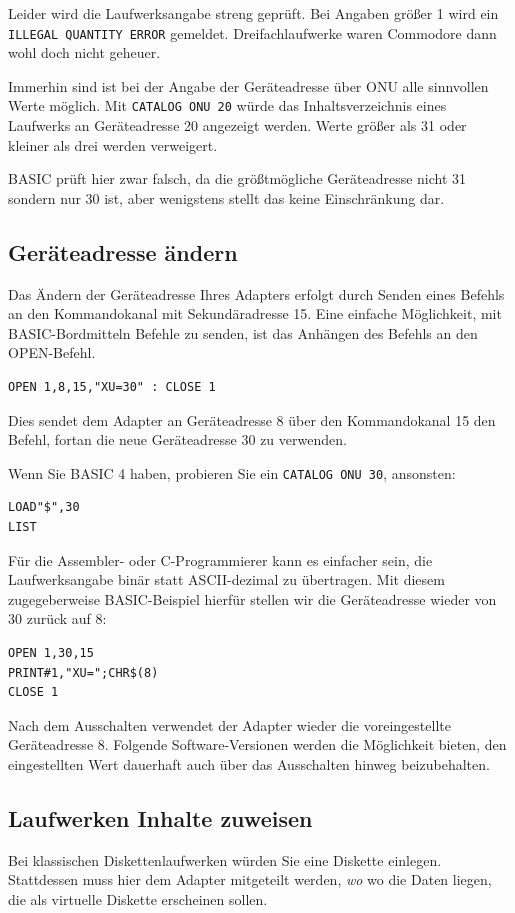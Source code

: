 \documentclass[10pt,a4paper]{scrartcl}		%
\begin{document}
Leider wird die Laufwerksangabe streng geprüft. Bei Angaben größer 1
wird ein \texttt{ILLEGAL QUANTITY ERROR} gemeldet. Dreifachlaufwerke
waren Commodore dann wohl doch nicht geheuer.

Immerhin sind ist bei der Angabe der Geräteadresse über ONU alle
sinnvollen Werte möglich. Mit \texttt{CATALOG ONU 20} würde das
Inhaltsverzeichnis eines Laufwerks an Geräteadresse 20 angezeigt werden.
Werte größer als 31 oder kleiner als drei werden verweigert. 

BASIC prüft hier zwar falsch, da die größtmögliche Geräteadresse nicht 31
sondern nur 30 ist, aber wenigstens stellt das keine Einschränkung dar.

\subsection{Geräteadresse ändern}
Das Ändern der Geräteadresse Ihres Adapters erfolgt durch Senden
eines Befehls an den Kommandokanal mit Sekundäradresse 15. Eine einfache
Möglichkeit, mit BASIC-Bordmitteln Befehle zu senden, ist das Anhängen
des Befehls an den OPEN-Befehl.

\begin{verbatim}
OPEN 1,8,15,"XU=30" : CLOSE 1
\end{verbatim}

Dies sendet dem Adapter an Geräteadresse 8 über den Kommandokanal 15
den Befehl, fortan die neue Geräteadresse 30 zu verwenden.

Wenn Sie BASIC 4 haben, probieren Sie ein \texttt{CATALOG ONU 30}, ansonsten:
\begin{verbatim}
LOAD"$",30
LIST
\end{verbatim}

Für die Assembler- oder C-Programmierer kann es einfacher sein,
die Laufwerksangabe binär statt ASCII-dezimal zu übertragen. Mit diesem
zugegeberweise BASIC-Beispiel hierfür stellen wir die Geräteadresse
wieder von 30 zurück auf 8:

\begin{verbatim}
OPEN 1,30,15
PRINT#1,"XU=";CHR$(8)
CLOSE 1
\end{verbatim}

Nach dem Ausschalten verwendet der Adapter wieder die voreingestellte
Geräteadresse 8. Folgende Software-Versionen werden die Möglichkeit 
bieten, den eingestellten Wert dauerhaft auch über das Ausschalten hinweg
beizubehalten.

\clearpage %
\subsection{Laufwerken Inhalte zuweisen}
Bei klassischen Diskettenlaufwerken würden Sie eine Diskette 
einlegen. Stattdessen muss hier dem Adapter mitgeteilt werden, 
\textit{wo} wo die Daten liegen, die als virtuelle Diskette 
erscheinen sollen.
\end{document}
